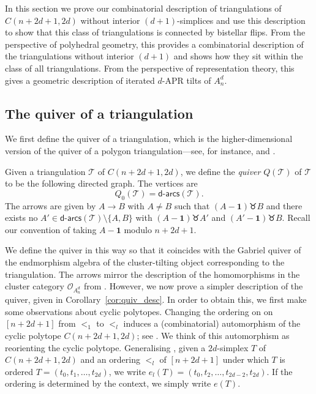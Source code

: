 \documentclass[ALCO,Unicode,published]{cedram}
\newcommand{\onevec}{\mathbf{1}} %
\newcommand{\darcs}[1]{\mathsf{d}\text{-}\mathsf{arcs}(#1)} %
\newcommand{\swr}{\taurus} %
\begin{document}
In this section we prove our combinatorial description of triangulations of $C(n + 2d + 1, 2d)$ without interior $(d + 1)$-simplices and use this description to show that this class of triangulations is connected by bistellar flips. From the perspective of polyhedral geometry, this provides a combinatorial description of the triangulations without interior $(d + 1)$ and shows how they sit within the class of all triangulations. From the perspective of representation theory, this gives a geometric description of iterated $d$-APR tilts of $A_{n}^{d}$.

\subsection{The quiver of a triangulation}

We first define the quiver of a triangulation, which is the higher-dimensional version of the quiver of a polygon triangulation---see, for instance, \cite[Section 3]{cdm-03} and \cite[Definition 2.12]{lkw-clus-intro}.

\begin{defi}\label{def:quiver}
Given a triangulation $\mathcal{T}$ of $C(n + 2d + 1, 2d)$, we define the \emph{quiver} $Q(\mathcal{T})$ of $\mathcal{T}$ to be the following directed graph. The vertices are \[Q_{0}(\mathcal{T}) = \darcs{\mathcal{T}}.\] The arrows are given by $A \to B$ with $A \neq B$ such that $(A - \onevec) \swr B$ and there exists no $A' \in \darcs{\mathcal{T}}\setminus\{A, B\}$ with $(A - \onevec) \swr A'$ and $(A' - \onevec) \swr B$. Recall our convention of taking $A - \onevec$ modulo $n + 2d + 1$.
\end{defi}

We define the quiver in this way so that it coincides with the Gabriel quiver of the endmorphism algebra of the cluster-tilting object corresponding to the triangulation. The arrows mirror the description of the homomorphisms in the cluster category $\mathcal{O}_{A_{n}^{d}}$ from \cite{ot}. However, we now prove a simpler description of the quiver, given in Corollary~\ref{cor:quiv_desc}. In order to obtain this, we first make some observations about cyclic polytopes. Changing the ordering on on $[n + 2d + 1]$ from $<_{1}$ to $<_{l}$ induces a (combinatorial) automorphism of the cyclic polytope $C(n + 2d + 1, 2d)$; see \cite{kw}. We think of this automorphism as reorienting the cyclic polytope. Generalising \cite{ot}, given a $2d$-simplex $T$ of $C(n + 2d + 1,2d)$ and an ordering $<_{l}$ of $[n + 2d + 1]$ under which $T$ is ordered $T = (t_{0}, t_{1}, \dots , t_{2d})$, we write $e_{l}(T) = (t_{0}, t_{2}, \dots , t_{2d-2}, t_{2d})$. If the ordering is determined by the context, we simply write $e(T)$.
\end{document}

